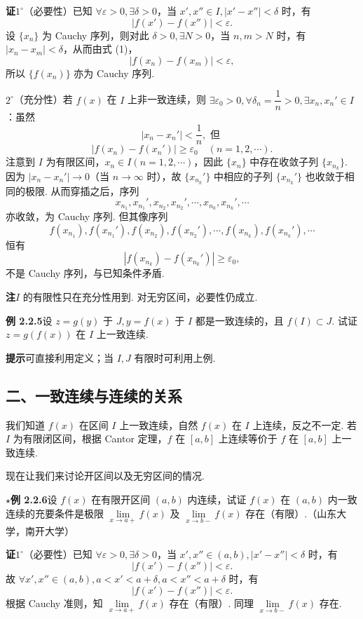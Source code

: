 \documentclass[UTF8,12pt,a4paper,fontset=fandol]{ctexart}
\begin{document}
\noindent\textbf{证}\quad $1^\circ$（必要性）已知 $\forall\varepsilon>0,\exists\delta>0$，当 $x',x''\in I,|x'-x''|<\delta$ 时，有
\[
  |f(x')-f(x'')|<\varepsilon. \tag{1}
\]
设 $\{x_n\}$ 为 Cauchy 序列，则对此 $\delta>0,\exists N>0$，当 $n,m>N$ 时，有 $|x_n-x_m|<\delta$，从而由式 (1)，
\[
  |f(x_n)-f(x_m)|<\varepsilon,
\]
所以 $\{f(x_n)\}$ 亦为 Cauchy 序列.

$2^\circ$（充分性）若 $f(x)$ 在 $I$ 上非一致连续，则 $\exists\varepsilon_0>0,\forall\delta_n=\dfrac1n>0,\exists x_n,x_n'\in I$：虽然
\[
  |x_n-x_n'|<\frac1n,\text{ 但 }
\]
\[
  |f(x_n)-f(x_n')|\ge\varepsilon_0\quad(n=1,2,\cdots). \tag{2}
\]
注意到 $I$ 为有限区间，$x_n\in I(n=1,2,\cdots)$，因此 $\{x_n\}$ 中存在收敛子列 $\{x_{n_k}\}$. 因为 $|x_n-x_n'|\to0$（当 $n\to\infty$ 时），故 $\{x_{n_k}'\}$ 中相应的子列 $\{x_{n_k}'\}$ 也收敛于相同的极限. 从而穿插之后，序列
\[
  x_{n_1},x_{n_1}',x_{n_2},x_{n_2}',\cdots,x_{n_k},x_{n_k}',\cdots
\]
亦收敛，为 Cauchy 序列. 但其像序列
\[
  f(x_{n_1}),f(x_{n_1}'),f(x_{n_2}),f(x_{n_2}'),\cdots,f(x_{n_k}),f(x_{n_k}'),\cdots
\]
恒有
\[
  |f(x_{n_k})-f(x_{n_k}')|\ge\varepsilon_0,
\]
不是 Cauchy 序列，与已知条件矛盾.

\noindent\textbf{注}\quad $I$ 的有限性只在充分性用到. 对无穷区间，必要性仍成立.

\noindent\textbf{例 2.2.5}\quad 设 $z=g(y)$ 于 $J,y=f(x)$ 于 $I$ 都是一致连续的，且 $f(I)\subset J$. 试证 $z=g(f(x))$ 在 $I$ 上一致连续.

\noindent\textbf{提示}\quad 可直接利用定义；当 $I,J$ 有限时可利用上例.

\subsection*{二、一致连续与连续的关系}

我们知道 $f(x)$ 在区间 $I$ 上一致连续，自然 $f(x)$ 在 $I$ 上连续，反之不一定. 若 $I$ 为有限闭区间，根据 Cantor 定理，$f$ 在 $[a,b]$ 上连续等价于 $f$ 在 $[a,b]$ 上一致连续.

现在让我们来讨论开区间以及无穷区间的情况.

\noindent\textbf{$\star$例 2.2.6}\quad 设 $f(x)$ 在有限开区间 $(a,b)$ 内连续，试证 $f(x)$ 在 $(a,b)$ 内一致连续的充要条件是极限 $\lim\limits_{x\to a+}f(x)$ 及 $\lim\limits_{x\to b-}f(x)$ 存在（有限）.（山东大学，南开大学）

\noindent\textbf{证}\quad $1^\circ$（必要性）已知 $\forall\varepsilon>0,\exists\delta>0$，当 $x',x''\in(a,b),|x'-x''|<\delta$ 时，有
\[
  |f(x')-f(x'')|<\varepsilon.
\]
故 $\forall x',x''\in(a,b),a<x'<a+\delta,a<x''<a+\delta$ 时，有
\[
  |f(x')-f(x'')|<\varepsilon.
\]
根据 Cauchy 准则，知 $\lim\limits_{x\to a+}f(x)$ 存在（有限）. 同理 $\lim\limits_{x\to b-}f(x)$ 存在.
\end{document}
